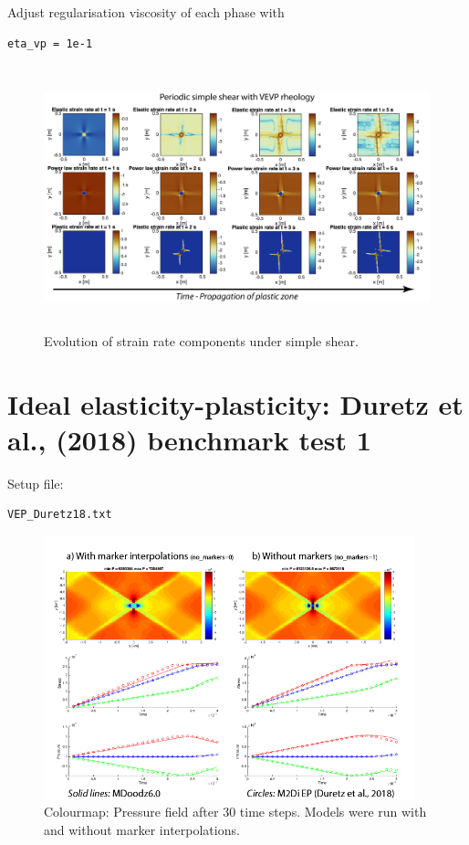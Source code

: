 \documentclass[12pt,english,openany]{scrbook}
\begin{document}
Adjust regularisation viscosity of each phase with
\begin{verbatim} 
eta_vp = 1e-1
\end{verbatim}

\begin{figure}[ht!]
\centerline{\includegraphics[height=3.0in]{./Figures/PeriodicSimpleShearVEVP_MDOODZ.png}}
\caption{Evolution of strain rate components under simple shear.}
\label{PeriodicSimpleShearVEVP_MDOODZ}
\end{figure}

\section{Ideal elasticity-plasticity: Duretz et al., (2018) benchmark test 1}

Setup file:
\begin{verbatim} 
VEP_Duretz18.txt
\end{verbatim}

\begin{figure}[ht!]
\centerline{\includegraphics[height=3.0in]{./Figures/VEP_Duretz18_MDOODZ.png}}
\caption{Colourmap: Pressure field after 30 time steps. Models were run with and without marker interpolations.}
\label{VEP_Duretz18}
\end{figure}
\end{document}
